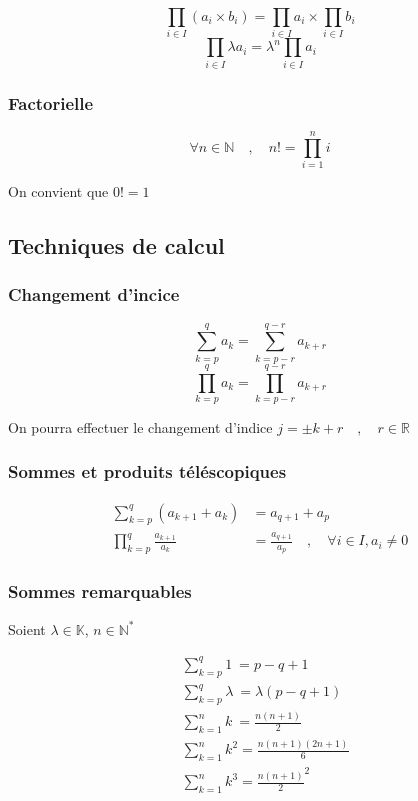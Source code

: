 \documentclass{report}
\newcommand{\R}{\mathbb{R}}
\newcommand{\qvq}{\quad , \quad}
\begin{document}
          \[\prod_{i\in I} (a_i\times b_i) = \prod_{i\in I} a_i \times \prod_{i\in I} b_i\]
          \[\prod_{i\in I} \lambda a_i = \lambda^n\prod_{i\in I} a_i\]

      \subsubsection{Factorielle}

          \[\forall n \in \mathbb{N} \qvq n! = \prod_{i=1}^{n} i\]

          On convient que $0! = 1$

    \subsection{Techniques de calcul}

      \subsubsection{Changement d'incice}

        \[\sum_{k = p}^{q} a_k = \sum_{k = p-r}^{q-r} a_{k+r}\]
        \[\prod_{k = p}^{q} a_k = \prod_{k = p-r}^{q-r} a_{k+r}\]\vspace{0.5em}

        On pourra effectuer le changement d'indice $\boxed{j = \pm k + r} \qvq r\in\R$

      \subsubsection{Sommes et produits téléscopiques}

        \begin{align*}
          \sum_{k = p}^{q} (a_{k+1}+a_k) &= a_{q+1}+a_p\\
          \prod_{k = p}^{q} \frac{a_{k+1}}{a_k} &= \frac{a_{q+1}}{a_p} \qvq \forall i\in I, a_i \not=0
        \end{align*}

      \subsubsection{Sommes remarquables}

        Soient $\lambda \in\mathbb{K}$, $n \in\mathbb{N}^*$

        \begin{align*}
          &\sum_{k=p}^{q} 1~    = p-q+1\\
          &\sum_{k=p}^{q} \lambda~ = \lambda(p-q+1)\\
          &\sum_{k=1}^{n} k~    = \frac{n(n+1)}{2}\\
          &\sum_{k=1}^{n} k^2  = \frac{n(n+1)(2n+1)}{6} \\
          &\sum_{k=1}^{n} k^3  = \frac{n(n+1)}{2}^2\\
        \end{align*}
\end{document}
